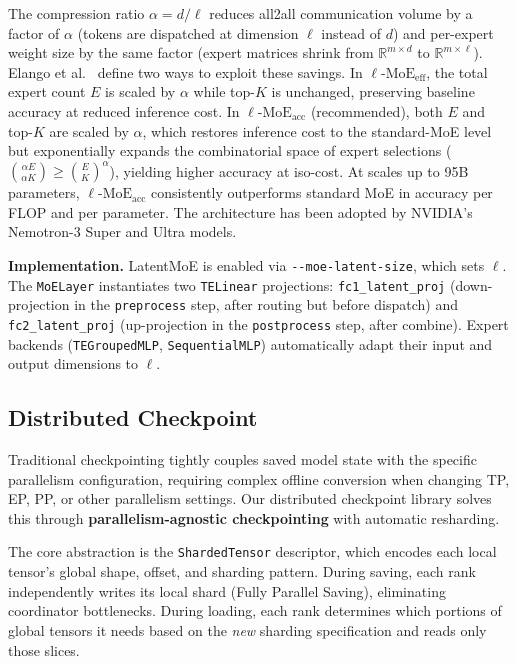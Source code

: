 \documentclass[10pt,logo,copyright]{nvidiatechreport}
\begin{document}
The compression ratio \(\alpha = d / \ell\) reduces all2all communication volume by a factor of \(\alpha\) (tokens are dispatched at dimension \(\ell\) instead of \(d\)) and per-expert weight size by the same factor (expert matrices shrink from \(\mathbb{R}^{m \times d}\) to \(\mathbb{R}^{m \times \ell}\)). Elango et al.~\cite{elango2026latentmoe} define two ways to exploit these savings. In \(\ell\text{-MoE}_{\text{eff}}\), the total expert count \(E\) is scaled by \(\alpha\) while top-\(K\) is unchanged, preserving baseline accuracy at reduced inference cost. In \(\ell\text{-MoE}_{\text{acc}}\) (recommended), both \(E\) and top-\(K\) are scaled by \(\alpha\), which restores inference cost to the standard-MoE level but exponentially expands the combinatorial space of expert selections (\(\binom{\alpha E}{\alpha K} \geq \binom{E}{K}^{\alpha}\)), yielding higher accuracy at iso-cost. At scales up to 95B parameters, \(\ell\text{-MoE}_{\text{acc}}\) consistently outperforms standard MoE in accuracy per FLOP and per parameter. The architecture has been adopted by NVIDIA's Nemotron-3 Super and Ultra models.

\textbf{Implementation.}
LatentMoE is enabled via \texttt{-{}-moe-latent-size}, which sets \(\ell\). The \texttt{MoELayer} instantiates two \texttt{TELinear} projections: \texttt{fc1\_latent\_proj} (down-projection in the \texttt{preprocess} step, after routing but before dispatch) and \texttt{fc2\_latent\_proj} (up-projection in the \texttt{postprocess} step, after combine). Expert backends (\texttt{TEGroupedMLP}, \texttt{SequentialMLP}) automatically adapt their input and output dimensions to \(\ell\).

\subsection{Distributed Checkpoint}

Traditional checkpointing tightly couples saved model state with the specific parallelism configuration, requiring complex offline conversion when changing TP, EP, PP, or other parallelism settings. Our distributed checkpoint library solves this through \textbf{parallelism-agnostic checkpointing} with automatic resharding.

The core abstraction is the \texttt{ShardedTensor} descriptor, which encodes each local tensor's global shape, offset, and sharding pattern. During saving, each rank independently writes its local shard (Fully Parallel Saving), eliminating coordinator bottlenecks. During loading, each rank determines which portions of global tensors it needs based on the \textit{new} sharding specification and reads only those slices.
\end{document}
